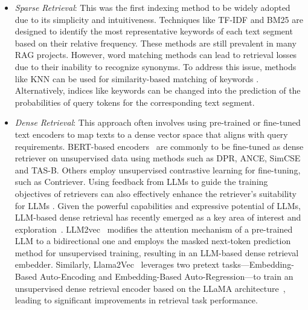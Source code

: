 \begin{itemize}
    \item \textit{Sparse Retrieval}: This was the first indexing method to be widely adopted due to its simplicity and intuitiveness. Techniques like TF-IDF and BM25\cite{sparck1972statistical, robertson1995okapi} are designed to identify the most representative keywords of each text segment based on their relative frequency. These methods are still prevalent in many RAG projects\cite{ram2023context, jiang2023active, xu2024recomp}. However, word matching methods can lead to retrieval losses due to their inability to recognize synonyms. To address this issue, methods like KNN can be used for similarity-based matching of keywords \cite{boytsov2016off}. Alternatively, indices like keywords can be changed into the prediction of the probabilities of query tokens for the corresponding text segment\cite{zhuang2021tilde, zhuang2021fast}.
    \item  \textit{Dense Retrieval}: This approach often involves using pre-trained or fine-tuned text encoders to map texts to a dense vector space that aligns with query requirements. BERT-based encoders~\cite{devlin2018bert} are commonly to be fine-tuned as dense retriever on unsupervised data using methods such as DPR\cite{karpukhin2020dense}, ANCE\cite{xiong2020approximate}, SimCSE\cite{gao2021simcse} and TAS-B\cite{hofstatter2021efficiently}. Others employ unsupervised contrastive learning for fine-tuning, such as  Contriever\cite{izacard2021unsupervised}. Using feedback from LLMs to guide the training objectives of retrievers can also effectively enhance the retriever's suitability for LLMs \cite{zhang2023retrieve, ma2023fine, borgeaud2022improving}. Given the powerful capabilities and expressive potential of LLMs, LLM-based dense retrieval has recently emerged as a key area of interest and exploration~\cite{ni2021large}. LLM2vec~\cite{behnamghader2024llm2vec} modifies the attention mechanism of a pre-trained LLM to a bidirectional one and employs the masked next-token prediction method for unsupervised training, resulting in an LLM-based dense retrieval embedder. Similarly, Llama2Vec~\cite{li2024llama2vec} leverages two pretext tasks—Embedding-Based Auto-Encoding and Embedding-Based Auto-Regression—to train an unsupervised dense retrieval encoder based on the LLaMA architecture~\cite{touvron2023llama}, leading to significant improvements in retrieval task performance.

\end{itemize}
